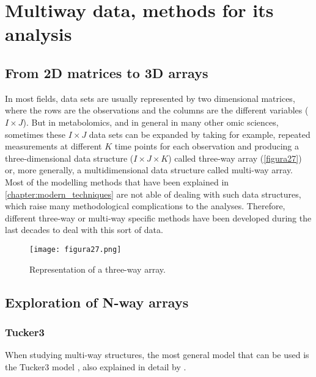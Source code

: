 
\chapter[Multiway data, methods for its analysis]{Multiway data, methods for its analysis}



\section{From 2D matrices to 3D arrays}
In most fields, data sets are usually represented by two dimensional matrices, where the rows are the observations and the columns are the different variables ($I \times J$). But in metabolomics, and in general in many other omic sciences, sometimes these $I \times J$ data sets can be expanded by taking for example, repeated measurements at different $K$ time points for each observation and producing a three-dimensional data structure ($I \times J \times K$) called three-way array (\autoref{figura27}) or, more generally, a multidimensional data structure called multi-way array. Most of the modelling methods that have been explained in \autoref{chapter:modern_techniques} are not able of dealing with such data structures, which raise many methodological complications to the analyses. Therefore, different three-way or multi-way specific methods have been developed during the last decades to deal with this sort of data.

\begin{figure}[hbtp]
\centering
\texttt{[image: figura27.png]}
\caption{Representation of a three-way array.}
\label{figura27}
\end{figure}

\section{Exploration of N-way arrays}
\subsection{Tucker3}
When studying multi-way structures, the most general model that can be used is the Tucker3 model \parencite{tucker1966some}, also explained in detail by \cite{kiers2001three}.

